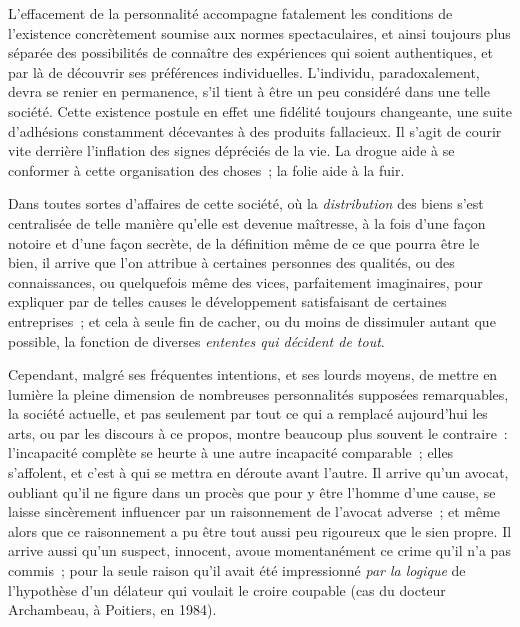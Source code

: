 \documentclass[french,twoside]{book} %
\def\mednobreak{\ifdim\lastskip<\medskipamount
  \removelastskip\nopagebreak\medskip\fi}
\newcommand{\labelblock}[1]{\medbreak{\noindent\color{rubric}\bfseries #1}\par\mednobreak}
\begin{document}
\labelblock{XII}

\noindent L’effacement de la personnalité accompagne fatalement les conditions de l’existence concrètement soumise aux normes spectaculaires, et ainsi toujours plus séparée des possibilités de connaître des expériences qui soient authentiques, et par là de découvrir ses préférences individuelles. L’individu, paradoxalement, devra se renier en permanence, s’il tient à être un peu considéré dans une telle société. Cette existence postule en effet une fidélité toujours changeante, une suite d’adhésions constamment décevantes à des produits fallacieux. Il s’agit de courir vite derrière l’inflation des signes dépréciés de la vie. La drogue aide à se conformer à cette organisation des choses ; la folie aide à la fuir.\par
Dans toutes sortes d’affaires de cette société, où la \emph{distribution} des biens s’est centralisée de telle manière qu’elle est devenue maîtresse, à la fois d’une façon notoire et d’une façon secrète, de la définition même de ce que pourra être le bien, il arrive que l’on attribue à certaines personnes des qualités, ou des connaissances, ou quelquefois même des vices, parfaitement imaginaires, pour expliquer par de telles causes le développement satisfaisant de certaines entreprises ; et cela à seule fin de cacher, ou du moins de dissimuler autant que possible, la fonction de diverses \emph{ententes qui décident de tout}.\par
Cependant, malgré ses fréquentes intentions, et ses lourds moyens, de mettre en lumière la pleine dimension de nombreuses personnalités supposées remarquables, la société actuelle, et pas seulement par tout ce qui a remplacé aujourd’hui les arts, ou par les discours à ce propos, montre beaucoup plus souvent le contraire : l’incapacité complète se heurte à une autre incapacité comparable ; elles s’affolent, et c’est à qui se mettra en déroute avant l’autre. Il arrive qu’un avocat, oubliant qu’il ne figure dans un procès que pour y être l’homme d’une cause, se laisse sincèrement influencer par un raisonnement de l’avocat adverse ; et même alors que ce raisonnement a pu être tout aussi peu rigoureux que le sien propre. Il arrive aussi qu’un suspect, innocent, avoue momentanément ce crime qu’il n’a pas commis ; pour la seule raison qu’il avait été impressionné \emph{par la logique} de l’hypothèse d’un délateur qui voulait le croire coupable (cas du docteur Archambeau, à Poitiers, en 1984).\par
\end{document}
